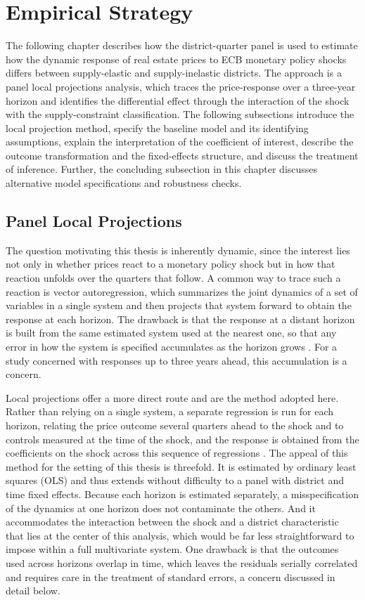 \documentclass[a4paper,12pt, headsepline]{scrartcl}
\numberwithin{equation}{section}
\begin{document}
\section{Empirical Strategy}\label{sec:strategy}

The following chapter describes how the district-quarter panel is used to estimate how the dynamic response of real estate prices to ECB monetary policy shocks differs between supply-elastic and supply-inelastic districts. The approach is a panel local projections analysis, which traces the price-response over a three-year horizon and identifies the differential effect through the interaction of the shock with the supply-constraint classification. The following subsections introduce the local projection method, specify the baseline model and its identifying assumptions, explain the interpretation of the coefficient of interest, describe the outcome transformation and the fixed-effects structure, and discuss the treatment of inference. Further, the concluding subsection in this chapter discusses alternative model specifications and robustness checks.

\subsection{Panel Local Projections}\label{subsec:lp}
The question motivating this thesis is inherently dynamic, since the interest lies not only in whether prices react to a monetary policy shock but in how that reaction unfolds over the quarters that follow. A common way to trace such a reaction is vector autoregression, which summarizes the joint dynamics of a set of variables in a single system and then projects that system forward to obtain the response at each horizon. The drawback is that the response at a distant horizon is built from the same estimated system used at the nearest one, so that any error in how the system is specified accumulates as the horizon grows \citep{jorda2005}. For a study concerned with responses up to three years ahead, this accumulation is a concern.

Local projections offer a more direct route and are the method adopted here. Rather than relying on a single system, a separate regression is run for each horizon, relating the price outcome several quarters ahead to the shock and to controls measured at the time of the shock, and the response is obtained from the coefficients on the shock across this sequence of regressions \citep{jorda2005}. The appeal of this method for the setting of this thesis is threefold. It is estimated by ordinary least squares (OLS) and thus extends without difficulty to a panel with district and time fixed effects. Because each horizon is estimated separately, a misspecification of the dynamics at one horizon does not contaminate the others. And it accommodates the interaction between the shock and a district characteristic that lies at the center of this analysis, which would be far less straightforward to impose within a full multivariate system. One drawback is that the outcomes used across horizons overlap in time, which leaves the residuals serially correlated and requires care in the treatment of standard errors, a concern discussed in detail below.
\end{document}
